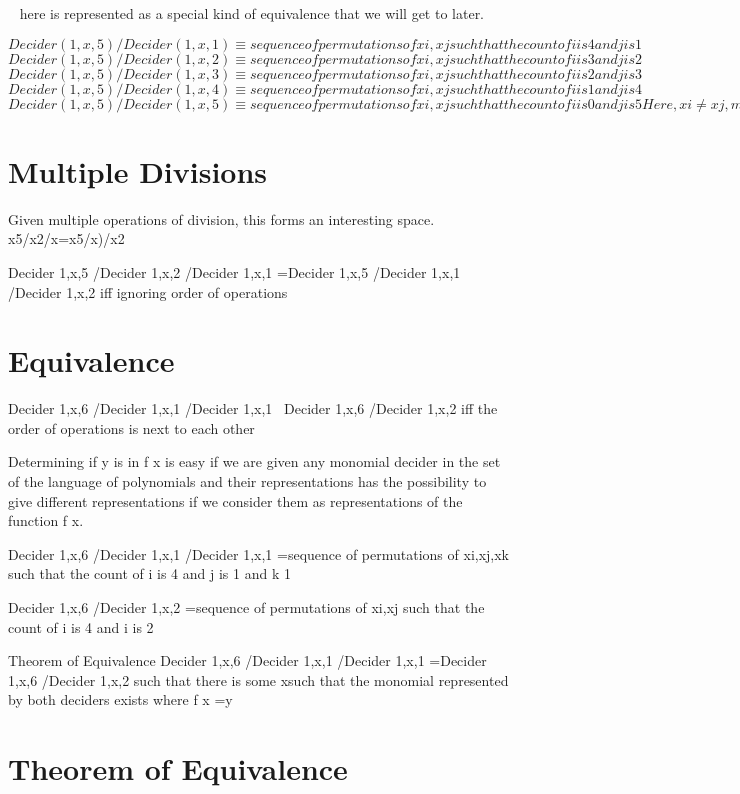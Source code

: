 ~ here is represented as a special kind of equivalence that we will get to later.

$Decider(1,x,5)/Decider(1,x,1) \equiv
 {sequence of permutations of {xi,xj} such that the count of i is 4 and j is 1}$
$Decider(1,x,5)/Decider(1,x,2) \equiv
 {sequence of permutations of {xi,xj} such that the count of i is 3 and j is 2}$
$Decider(1,x,5)/Decider(1,x,3) \equiv
 {sequence of permutations of {xi,xj} such that the count of i is 2 and j is 3}$
$Decider(1,x,5)/Decider(1,x,4) \equiv
 {sequence of permutations of {xi,xj} such that the count of i is 1 and j is 4}$
$Decider(1,x,5)/Decider(1,x,5) \equiv
 {sequence of permutations of {xi,xj} such that the count of i is 0 and j is 5} Here, xi \neq
 xj, meaning xi is of a different representation than xj$

\section{Multiple Divisions}

Given multiple operations of division, this forms an interesting space.
x5/x2/x=x5/x)/x2

Decider 1,x,5 /Decider 1,x,2 /Decider 1,x,1 =Decider 1,x,5 /Decider 1,x,1 /Decider 1,x,2
 iff ignoring order of operations
 
\section{Equivalence}

Decider 1,x,6 /Decider 1,x,1 /Decider 1,x,1 ~Decider 1,x,6 /Decider 1,x,2
  iff the order of operations is next to each other

Determining if y is in f x is easy if we are given any monomial decider in the set of the language of polynomials and their representations has the possibility to give different representations if we consider them as representations of the function f x.

Decider 1,x,6 /Decider 1,x,1 /Decider 1,x,1 =sequence of permutations of xi,xj,xk such that the count of i is 4 and j is 1 and k 1


Decider 1,x,6 /Decider 1,x,2 =sequence of permutations of xi,xj such that the count of i is 4 and i is 2


Theorem of Equivalence
Decider 1,x,6 /Decider 1,x,1 /Decider 1,x,1 =Decider 1,x,6 /Decider 1,x,2 such that there is some xsuch that the monomial represented by both deciders exists where f x =y

\section{Theorem of Equivalence}

